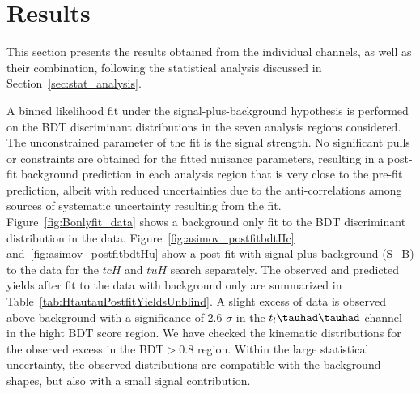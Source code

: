 \section{Results}
\label{sec:result}

This section presents the results obtained from the individual channels, as well as their combination,
following the statistical analysis discussed in Section~\ref{sec:stat_analysis}.

A binned likelihood fit under the signal-plus-background hypothesis is performed on the BDT discriminant distributions in the seven 
analysis regions considered. The unconstrained parameter of the fit is the signal strength.
No significant pulls or constraints are obtained for the fitted nuisance parameters, resulting in a post-fit background prediction in each analysis region that is
very close to the pre-fit prediction, albeit with reduced uncertainties due to the anti-correlations among sources of systematic uncertainty resulting from the fit.
Figure~\ref{fig:Bonlyfit_data} shows a background only fit to the BDT discriminant distribution in the data.
Figure~\ref{fig:asimov_postfitbdtHc} and~\ref{fig:asimov_postfitbdtHu} show a post-fit with signal plus background (S+B) to the data for
the $tcH$ and $tuH$ search separately.
The observed and predicted yields after fit to the data with background only are summarized in Table~\ref{tab:HtautauPostfitYieldsUnblind}.
A slight excess of data is observed above background with a significance of 2.6 $\sigma$ in the $t_l\thadhad$ channel in the hight BDT score region.
We have checked the kinematic distributions for the observed excess in
the BDT$>0.8$ region. Within the large statistical uncertainty, the observed distributions are compatible with the background shapes, but also with a small signal
contribution.

